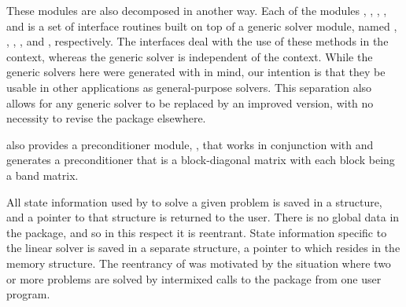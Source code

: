 These modules are also decomposed in another way.
Each of the modules {\idadense}, {\idaband}, {\idaspgmr}, {\idaspbcg}, and {\idasptfqmr}
is a set of interface routines built on top of a generic solver module, 
named {\dense}, {\band}, {\spgmr}, {\spbcg}, and {\sptfqmr}, respectively.  
The interfaces deal with the use of these methods in the {\idas} context, 
whereas the generic solver is independent of the context.
While the generic solvers here were generated with {\sundials} in mind, our
intention is that they be usable in other applications as
general-purpose solvers.  This separation also allows for any generic
solver to be replaced by an improved version, with no necessity to
revise the {\idas} package elsewhere.

{\idas} also provides a preconditioner module,
{\idabbdpre}, that works in conjunction with {\nvecp} and generates a 
preconditioner that is a block-diagonal matrix with each block being 
a band matrix.

All state information used by {\idas} to solve a given problem is saved
in a structure, and a pointer to that structure is returned to the
user.  There is no global data in the {\idas} package, and so in this
respect it is reentrant. State information specific to the linear
solver is saved in a separate structure, a pointer to which resides in
the {\idas} memory structure. The reentrancy of {\idas} was motivated
by the situation where two or more problems are solved by
intermixed calls to the package from one user program.

